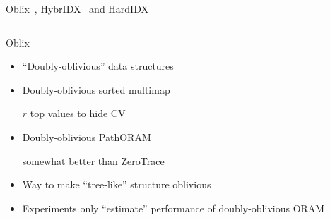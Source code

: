 		\begin{frame}{Oblix~\cite{seal}, HybrIDX~\cite{hybr-idx} and HardIDX~\cite{hardidx}}

			\begin{columns}[T,onlytextwidth]

					\begin{block}{Oblix~\cite{seal}}

						\begin{itemize}
							\item ``Doubly-oblivious'' data structures
							\item Doubly-oblivious sorted multimap \\
								\begin{small}
									$r$ top values to hide CV
								\end{small}
							\item Doubly-oblivious PathORAM \\
								\begin{small}
									somewhat better than ZeroTrace~\cite{zerotrace}
								\end{small}
							\item Way to make ``tree-like'' structure oblivious
							\item Experiments only ``estimate'' performance of doubly-oblivious ORAM
						\end{itemize}

					\end{block}





\end{columns}
\end{frame}
